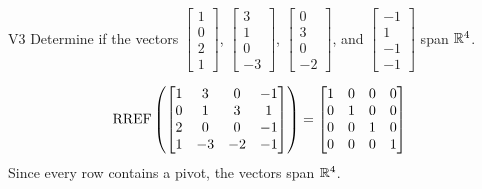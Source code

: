 \begin{problem}{V3}
Determine if the vectors \(\begin{bmatrix} 1 \\ 0 \\ 2 \\1 \end{bmatrix}\), \(\begin{bmatrix} 3 \\ 1 \\ 0 \\ -3 \end{bmatrix}\), \(\begin{bmatrix} 0 \\ 3 \\ 0 \\ -2 \end{bmatrix}\), and \(\begin{bmatrix}-1 \\ 1 \\ -1 \\ -1 \end{bmatrix}\) span \(\mathbb{R}^4\).
\end{problem}
\begin{solution}
\[\operatorname{RREF}\left(\begin{bmatrix}1 & 3 & 0 & -1 \\ 0 & 1 & 3 & 1 \\ 2 & 0 & 0 & -1 \\ 1 & -3 & -2 & -1 \end{bmatrix} \right) =\begin{bmatrix} 1 & 0 & 0 & 0 \\ 0 & 1 & 0 & 0 \\ 0 & 0 & 1 & 0 \\ 0 & 0 & 0 & 1 \end{bmatrix}\]
Since every row contains a pivot, the vectors span \(\mathbb{R}^4\).
\end{solution}

